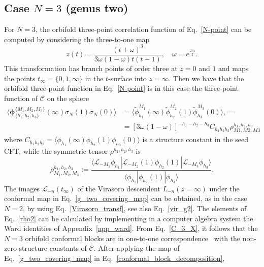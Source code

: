 \documentclass[a4paper,11pt]{article}
\begin{document}
\subsection{Case $N=3$ (genus two)}\label{sec:genus_two}

For $N=3$, the orbifold three-point correlation 
function of Eq.~\eqref{N-point} can be computed 
by considering the three-to-one map~\cite{Collier}
\begin{equation}\label{g_two_covering_map}
 z(t) =\frac{(t+\omega)^3}{3\omega(1-\omega)t(t-1)},\quad \omega=e^{\frac{2\pi i}{3}}.
\end{equation}
This transformation has branch points of order three at 
$z=0$ and $1$ and maps the points $t_{\infty}=\{0, 1, \infty\}$ in the $t$-surface into $z=\infty$. 
Then we have that the orbifold three-point function in Eq.~\eqref{N-point} is in this case the three-point 
function of $\mathcal{C}$ on the sphere
\begin{align}\label{C_3_X}
 \langle \boldsymbol{\phi}^{\{M_1,M_2,M_3\}}_{\{h_1,h_2,h_3\}}(\infty) \sigma_{N}(1)\bar{\sigma}_{N}(0)\rangle &=\langle \tilde{\phi}_{h_1}^{M_1} (\infty) \tilde{\phi}_{h_2}^{M_2}(1) \tilde{\phi}_{h_3}^{M_3}(0)\rangle,
 = \\
 &=[3\omega(1-\omega)]^{-h_1-h_2-h_3}C_{h_1h_2h_3}\rho_{M1,M2,M3}^{h_1,h_2,h_3}
\end{align}
where $C_{h_1 h_2 h_3}=\langle \phi_{h_1}(\infty)\phi_{h_2}(1)\phi_{h_3}(0)\rangle$ is a structure constant in the seed CFT, while the symmetric tensor $\rho^{h_1,h_2,h_3}$ is 
\begin{equation}
\label{rho2}
 \rho^{h_1,h_2,h_3}_{M_1,M_2,M_3}:=
 \frac{\langle \mathcal{L}_{-M_1}\phi_{h_1}|\mathcal{L}_{-M_2}(1)\phi_{h_2}(1)|\mathcal{L}_{-M_3}\phi_{h_3}\rangle}
 { \langle \phi_{h_1}|\phi_{h_2}(1)|\phi_{h_3}\rangle}.
\end{equation}
The images $\mathcal{L}_{-n}(t_{\infty})$ of the Virasoro descendent $L_{-n}(z=\infty)$ 
under the conformal map in Eq.~\eqref{g_two_covering_map} can be obtained, as in the 
case $N=2$, by using Eq.~\eqref{Virasoro_transf}, see also Eq.~\eqref{vir_g2}.
The elements of Eq.~\eqref{rho2} can be calculated by implementing in a computer algebra system 
the Ward identities of Appendix~\ref{app_ward}. 
From Eq.~\eqref{C_3_X}, it follows that the $N=3$ orbifold conformal blocks are in one-to-one correspondence~\cite{Cardy, Collier} 
with the non-zero structure constants of $\mathcal{C}$.
After applying the map of Eq.~\eqref{g_two_covering_map} in Eq.~\eqref{conformal_block_decomposition},
\end{document}
